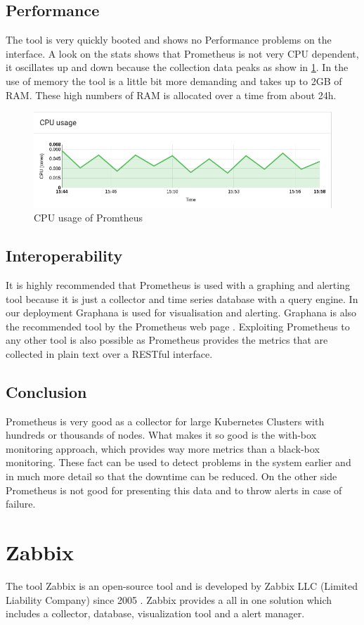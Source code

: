 \subsection{Performance}
The tool is very quickly booted and shows no Performance problems on the interface. A look on the stats shows that Prometheus is not very CPU dependent, it oscillates up and down because the collection data peaks as show in \cref{fig:Prometeus_Cpu}. In the use of memory the tool is a little bit more demanding and takes up to 2GB of RAM. These high numbers of RAM is allocated over a time from about 24h. 
\begin{figure}
\centering
\includegraphics[width=0.5\linewidth]{Bilder/Performance/Prometeus_Cpu}
\caption{CPU usage of Promtheus}
\label{fig:Prometeus_Cpu}
\end{figure}
\subsection{Interoperability}
It is highly recommended that Prometheus is used with a graphing and alerting tool because it is just a collector and time series database with a query engine. In our deployment Graphana is used for visualisation and alerting. Graphana is also the recommended tool by the Prometheus web page \cite{prometheus}. Exploiting Prometheus to any other tool is also possible as Prometheus provides the metrics that are collected in plain text over a RESTful interface.
\subsection{Conclusion}
Prometheus is very good as a collector for large Kubernetes Clusters with hundreds or thousands of nodes. What makes it so good is the with-box monitoring approach, which provides way more metrics than a black-box monitoring. These fact can be used to detect problems in the system earlier and in much more detail so that the downtime can be reduced. On the other side Prometheus is not good for presenting this data and to throw alerts in case of failure.

\section{Zabbix}
\label{Zabbix} %
\cite{Hernantes2015}
The tool Zabbix is an open-source tool and is developed by Zabbix LLC (Limited Liability Company) since 2005 \cite{zabbix}. Zabbix provides a all in one solution which includes a collector, database, visualization tool and a alert manager.
